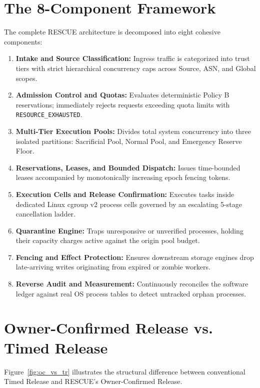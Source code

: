\documentclass[12pt,a4paper]{report}
\begin{document}
\section{The 8-Component Framework}
The complete RESCUE architecture is decomposed into eight cohesive components:
\begin{enumerate}[label=\textbf{\arabic*.}]
    \item \textbf{Intake and Source Classification:} Ingress traffic is categorized into trust tiers with strict hierarchical concurrency caps across Source, ASN, and Global scopes.
    \item \textbf{Admission Control and Quotas:} Evaluates deterministic Policy B reservations; immediately rejects requests exceeding quota limits with \texttt{RESOURCE\_EXHAUSTED}.
    \item \textbf{Multi-Tier Execution Pools:} Divides total system concurrency into three isolated partitions: Sacrificial Pool, Normal Pool, and Emergency Reserve Floor.
    \item \textbf{Reservations, Leases, and Bounded Dispatch:} Issues time-bounded leases accompanied by monotonically increasing epoch fencing tokens.
    \item \textbf{Execution Cells and Release Confirmation:} Executes tasks inside dedicated Linux cgroup v2 process cells governed by an escalating 5-stage cancellation ladder.
    \item \textbf{Quarantine Engine:} Traps unresponsive or unverified processes, holding their capacity charges active against the origin pool budget.
    \item \textbf{Fencing and Effect Protection:} Ensures downstream storage engines drop late-arriving writes originating from expired or zombie workers.
    \item \textbf{Reverse Audit and Measurement:} Continuously reconciles the software ledger against real OS process tables to detect untracked orphan processes.
\end{enumerate}

\section{Owner-Confirmed Release vs. Timed Release}
Figure~\ref{fig:oc_vs_tr} illustrates the structural difference between conventional Timed Release and RESCUE's Owner-Confirmed Release.
\end{document}
